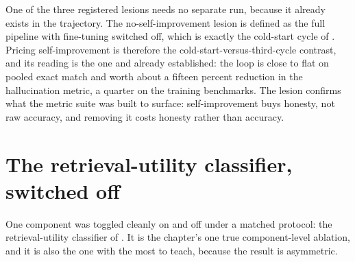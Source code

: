\begin{precise}
One of the three registered lesions needs no separate run, because it already exists in
the trajectory. The no-self-improvement lesion is defined as the full pipeline with
fine-tuning switched off, which is exactly the cold-start cycle of .
Pricing self-improvement is therefore the cold-start-versus-third-cycle contrast, and
its reading is the one  and  already established:
the loop is close to flat on pooled exact match and worth about a fifteen percent
reduction in the hallucination metric, a quarter on the training benchmarks. The lesion
confirms what the metric suite was built to surface: self-improvement buys honesty, not
raw accuracy, and removing it costs honesty rather than accuracy.
\end{precise}

\section{The retrieval-utility classifier, switched off}
\label{sec:abl-ruc}

One component was toggled cleanly on and off under a matched protocol: the
retrieval-utility classifier of . It is the chapter's one true
component-level ablation, and it is also the one with the most to teach, because the
result is asymmetric.

